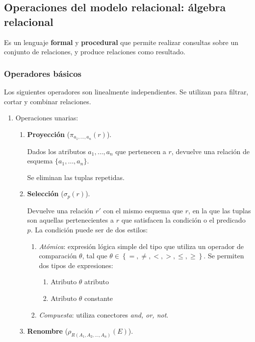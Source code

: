 \documentclass[a4paper, twoside]{article}
\begin{document}
\subsection{Operaciones del modelo relacional: álgebra relacional}

Es un lenguaje\textbf{ formal }y \textbf{procedural }que\textbf{ }permite
realizar consultas sobre un conjunto de relaciones, y produce relaciones
como resultado.


\subsubsection{Operadores básicos}

Los siguientes operadores son linealmente independientes. Se utilizan
para filtrar,\emph{ }cortar y combinar relaciones.
\begin{enumerate}
\item Operaciones unarias:

\begin{enumerate}
\item \textbf{Proyección} ($\pi_{a_{1},\dots,a_{n}}(r)$). 


Dados los atributos $a_{1},\dots,a_{n}$ que pertenecen a $r$, devuelve
una relación de esquema $\{a_{1},\dots,a_{n}\}$.


Se eliminan las tuplas repetidas.

\item \textbf{Selección} ($\sigma_{p}(r)$). 


Devuelve una relación $r'$ con el mismo esquema que $r$, en la que
las tuplas son aquellas pertenecientes a $r$ que satisfacen la condición
o el predicado $p$. La condición puede ser de dos estilos:
\begin{enumerate}
\item \emph{Atómica}: expresión lógica simple del tipo que utiliza un operador
de comparación $\theta$, tal que $\theta\in\left\{ =,\neq,<,>,\leq,\geq\right\} $.
Se permiten dos tipos de expresiones:

\begin{enumerate}
\item Atributo $\theta$ atributo
\item Atributo $\theta$ constante
\end{enumerate}
\item \emph{Compuesta}: utiliza conectores \emph{and, or, not}.
\end{enumerate}
\item \textbf{Renombre} ($\rho_{R(A_{1},A_{2},\dots,A_{n})}(E)$). 



\end{enumerate}
\end{enumerate}
\end{document}
